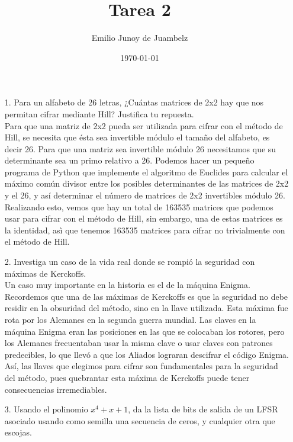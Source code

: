 \documentclass[12pt]{article}
\title{Tarea 2}
\author{Emilio Junoy de Juambelz}
\date{\today}
\begin{document}
  \maketitle
  \begin{enumerate}
    \item[1.] Para un alfabeto de 26 letras, ¿Cuántas matrices de 2x2 hay que nos permitan cifrar mediante Hill?
      Justifica tu repuesta.\\
      Para que una matriz de 2x2 pueda ser utilizada para cifrar con el método de Hill, se necesita que 
      ésta sea invertible módulo el tamaño del alfabeto, es decir 26. Para que una matriz sea invertible 
      módulo 26 necesitamos que su determinante sea un primo relativo a 26. Podemos hacer un pequeño programa de Python
      que implemente el algoritmo de Euclides para calcular el máximo común divisor entre los posibles determinantes de 
      las matrices de 2x2 y el 26, y así determinar el número de matrices de 2x2 invertibles módulo 26.\\
      Realizando esto, vemos que hay un total de 163535 matrices que podemos usar para cifrar con el método de Hill,
      sin embargo, una de estas matrices es la identidad, asì que tenemos 163535 matrices para cifrar no trivialmente 
      con el método de Hill.
    
    \item[2.] Investiga un caso de la vida real donde se rompió la seguridad con máximas de Kerckoffs.\\
      Un caso muy importante en la historia es el de la máquina Enigma. Recordemos que una de las máximas de Kerckoffs 
      es que la seguridad no debe residir en la obsuridad del método, sino en la llave utilizada. Esta máxima fue rota
      por los Alemanes en la segunda guerra mundial. Las claves en la máquina Enigma eran las posiciones en las que se
      colocaban los rotores, pero los Alemanes frecuentaban usar la misma clave o usar claves con patrones predecibles, 
      lo que llevó a que los Aliados lograran descifrar el código Enigma.
      Así, las llaves que elegimos para cifrar 
      son fundamentales para la seguridad del método, pues quebrantar esta máxima de Kerckoffs puede tener 
      consecuencias irremediables.

    \item[3.] Usando el polinomio $x^4+x+1$, da la lista de bits de salida de un LFSR asociado usando como semilla 
      una secuencia de ceros, y cualquier otra que escojas.


\end{enumerate}
\end{document}
